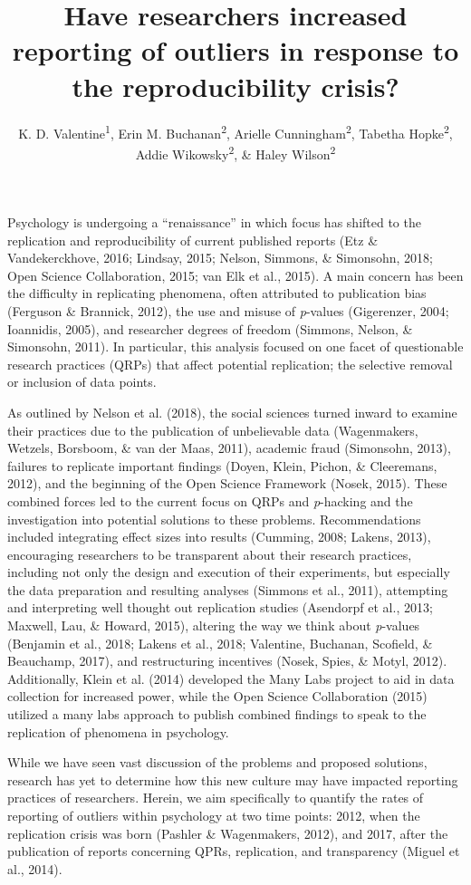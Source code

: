 \documentclass[english,man]{apa6}
\title{Have researchers increased reporting of outliers in response to the
reproducibility crisis?}
\author{K. D. Valentine\textsuperscript{1}, Erin M. Buchanan\textsuperscript{2}, Arielle Cunningham\textsuperscript{2}, Tabetha Hopke\textsuperscript{2}, Addie Wikowsky\textsuperscript{2}, \& Haley Wilson\textsuperscript{2}}
\affiliation{
    \vspace{0.5cm}
          \textsuperscript{1} University of Missouri\\
          \textsuperscript{2} Missouri State University  }
\theoremstyle{definition}
\theoremstyle{definition}
\theoremstyle{definition}
\theoremstyle{remark}
\begin{document}
\maketitle

\setcounter{secnumdepth}{0}



Psychology is undergoing a \enquote{renaissance} in which focus has
shifted to the replication and reproducibility of current published
reports (Etz \& Vandekerckhove, 2016; Lindsay, 2015; Nelson, Simmons, \&
Simonsohn, 2018; Open Science Collaboration, 2015; van Elk et al.,
2015). A main concern has been the difficulty in replicating phenomena,
often attributed to publication bias (Ferguson \& Brannick, 2012), the
use and misuse of \emph{p}-values (Gigerenzer, 2004; Ioannidis, 2005),
and researcher degrees of freedom (Simmons, Nelson, \& Simonsohn, 2011).
In particular, this analysis focused on one facet of questionable
research practices (QRPs) that affect potential replication; the
selective removal or inclusion of data points.

As outlined by Nelson et al. (2018), the social sciences turned inward
to examine their practices due to the publication of unbelievable data
(Wagenmakers, Wetzels, Borsboom, \& van der Maas, 2011), academic fraud
(Simonsohn, 2013), failures to replicate important findings (Doyen,
Klein, Pichon, \& Cleeremans, 2012), and the beginning of the Open
Science Framework (Nosek, 2015). These combined forces led to the
current focus on QRPs and \emph{p}-hacking and the investigation into
potential solutions to these problems. Recommendations included
integrating effect sizes into results (Cumming, 2008; Lakens, 2013),
encouraging researchers to be transparent about their research
practices, including not only the design and execution of their
experiments, but especially the data preparation and resulting analyses
(Simmons et al., 2011), attempting and interpreting well thought out
replication studies (Asendorpf et al., 2013; Maxwell, Lau, \& Howard,
2015), altering the way we think about \emph{p}-values (Benjamin et al.,
2018; Lakens et al., 2018; Valentine, Buchanan, Scofield, \& Beauchamp,
2017), and restructuring incentives (Nosek, Spies, \& Motyl, 2012).
Additionally, Klein et al. (2014) developed the Many Labs project to aid
in data collection for increased power, while the Open Science
Collaboration (2015) utilized a many labs approach to publish combined
findings to speak to the replication of phenomena in psychology.

While we have seen vast discussion of the problems and proposed
solutions, research has yet to determine how this new culture may have
impacted reporting practices of researchers. Herein, we aim specifically
to quantify the rates of reporting of outliers within psychology at two
time points: 2012, when the replication crisis was born (Pashler \&
Wagenmakers, 2012), and 2017, after the publication of reports
concerning QPRs, replication, and transparency (Miguel et al., 2014).
\end{document}
